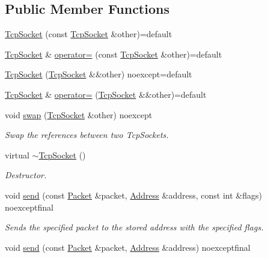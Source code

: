 \subsection*{Public Member Functions}
\begin{DoxyCompactItemize}
\item 
\hyperlink{classtnnf_1_1_tcp_socket_a99a359023e849d77baf1b0e7566116d7}{Tcp\+Socket} (const \hyperlink{classtnnf_1_1_tcp_socket}{Tcp\+Socket} \&other)=default
\item 
\hyperlink{classtnnf_1_1_tcp_socket}{Tcp\+Socket} \& \hyperlink{classtnnf_1_1_tcp_socket_a27cd1fcee0d7f961555383a89b7725ef}{operator=} (const \hyperlink{classtnnf_1_1_tcp_socket}{Tcp\+Socket} \&other)=default
\item 
\hyperlink{classtnnf_1_1_tcp_socket_af13142e742635325c78a9201bebb7c9d}{Tcp\+Socket} (\hyperlink{classtnnf_1_1_tcp_socket}{Tcp\+Socket} \&\&other) noexcept=default
\item 
\hyperlink{classtnnf_1_1_tcp_socket}{Tcp\+Socket} \& \hyperlink{classtnnf_1_1_tcp_socket_afbe6c348aaffb7b3efca529e6b2250bd}{operator=} (\hyperlink{classtnnf_1_1_tcp_socket}{Tcp\+Socket} \&\&other)=default
\item 
void \hyperlink{classtnnf_1_1_tcp_socket_a298fedb5dd30eee151175e95164d7373}{swap} (\hyperlink{classtnnf_1_1_tcp_socket}{Tcp\+Socket} \&other) noexcept
\begin{DoxyCompactList}\small\item\em Swap the references between two Tcp\+Sockets. \end{DoxyCompactList}\item 
virtual \hyperlink{classtnnf_1_1_tcp_socket_afc468cda1569604b3514aa6c80ae19d0}{$\sim$\+Tcp\+Socket} ()
\begin{DoxyCompactList}\small\item\em Destructor. \end{DoxyCompactList}\item 
void \hyperlink{classtnnf_1_1_tcp_socket_a7aa8f759eb3b96498b0a99bffd3e42e1}{send} (const \hyperlink{classtnnf_1_1_packet}{Packet} \&packet, \hyperlink{classtnnf_1_1_address}{Address} \&address, const int \&flags) noexceptfinal
\begin{DoxyCompactList}\small\item\em Sends the specified packet to the stored address with the specified flags. \end{DoxyCompactList}\item 
void \hyperlink{classtnnf_1_1_tcp_socket_accbb5359d1cc9580bab8f209c85581ed}{send} (const \hyperlink{classtnnf_1_1_packet}{Packet} \&packet, \hyperlink{classtnnf_1_1_address}{Address} \&address) noexceptfinal

\end{DoxyCompactItemize}
